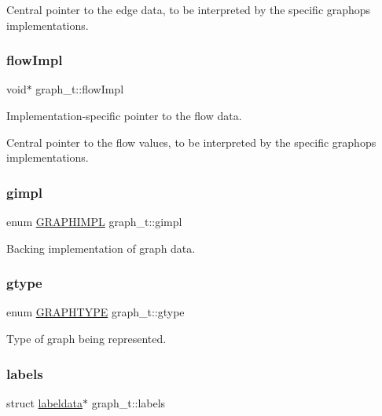 Central pointer to the edge data, to be interpreted by the specific graphops implementations. \mbox{\label{structgraph__t_aff85993441e72a7815da3fa1b048e5eb}} 
\subsubsection{\texorpdfstring{flow\+Impl}{flowImpl}}
{\footnotesize\ttfamily void$\ast$ graph\+\_\+t\+::flow\+Impl}



Implementation-\/specific pointer to the flow data. 

Central pointer to the flow values, to be interpreted by the specific graphops implementations. \mbox{\label{structgraph__t_a220aff118ba6d13c927486099988c03d}} 
\subsubsection{\texorpdfstring{gimpl}{gimpl}}
{\footnotesize\ttfamily enum \hyperlink{graphdata_8h_ad7f3a639f97221897a0429715dccefe6}{G\+R\+A\+P\+H\+I\+M\+PL} graph\+\_\+t\+::gimpl}

Backing implementation of graph data. \mbox{\label{structgraph__t_a602be255ab0523e0a5fe28436a29159a}} 
\subsubsection{\texorpdfstring{gtype}{gtype}}
{\footnotesize\ttfamily enum \hyperlink{graphdata_8h_a384e88b524b782ff50439055cbc8a5c2}{G\+R\+A\+P\+H\+T\+Y\+PE} graph\+\_\+t\+::gtype}

Type of graph being represented. \mbox{\label{structgraph__t_a2ea51094b5b0a3b3035895948ded5b44}} 
\subsubsection{\texorpdfstring{labels}{labels}}
{\footnotesize\ttfamily struct \hyperlink{graphdata_8h_a625fc818ed28f282dba71f20cd31b848}{labeldata}$\ast$ graph\+\_\+t\+::labels}

